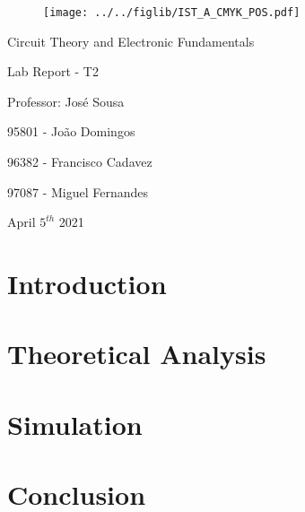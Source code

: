 \documentclass[11pt]{article}
\begin{document}
\thispagestyle{empty}
\begin{figure}[h]
	\centering
	\texttt{[image: ../../figlib/IST\_A\_CMYK\_POS.pdf]}
\end{figure}

\begin{center}
	\huge{Circuit Theory and Electronic Fundamentals}
	
	\huge{Lab Report - T2}
	
	\vspace{30pt}
	
	\large{Professor: José Sousa}
	
	\vspace{20pt}
	
	\large{95801 - João Domingos}
	
	\large{96382 - Francisco Cadavez}
	
	\large{97087 - Miguel Fernandes}
	
	\vspace{20pt}
	
	\large{April $5^{th}$ 2021}
\end{center}

\pagebreak
\tableofcontents

\pagebreak
\section{Introduction}


\pagebreak
\section{Theoretical Analysis}


\pagebreak
\section{Simulation}


\pagebreak
\section{Conclusion}

\end{document}
